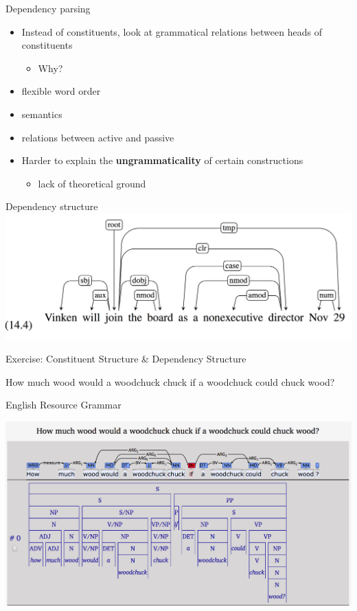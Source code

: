 \documentclass{beamer}
\begin{document}
\begin{frame}{Dependency parsing}

  \begin{itemize}
  \item Instead of constituents, look at grammatical relations between heads of constituents
    \begin{itemize}
    \item Why?
    \end{itemize}
  \item flexible word order
  \item semantics
  \item relations between active and passive
  \item Harder to explain the {\bf ungrammaticality} of certain constructions
    \begin{itemize}
    \item lack of theoretical ground
    \end{itemize}
  \end{itemize}
\end{frame}

\begin{frame}{Dependency structure}
  \includegraphics[width=\textwidth]{figures/dep1}
\end{frame}

\begin{frame}{Exercise: Constituent Structure \& Dependency Structure}

  How much wood would a woodchuck chuck if a woodchuck could chuck
  wood?

\end{frame}

\begin{frame}{English Resource Grammar}

  \includegraphics[width=\textwidth]{figures/woodchuck}

\end{frame}
\end{document}
